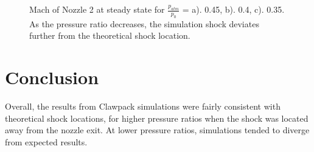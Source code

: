 \documentclass{article}%
\numberwithin{equation}{section}
\begin{document}
\begin{figure}[h!]
\centering
{}
\caption{Mach of Nozzle 2 at steady state for $\frac{p_{atm}}{p_0}$ = a). 0.45, b). 0.4, c). 0.35. As the pressure ratio decreases, the simulation shock deviates further from the theoretical shock location. \label{nozz2shock}}
\end{figure}

\section{Conclusion}
Overall, the results from Clawpack simulations were fairly consistent with theoretical shock locations, for higher pressure ratios when the shock was located away from the nozzle exit. At lower pressure ratios, simulations tended to diverge from expected results.
\end{document}
